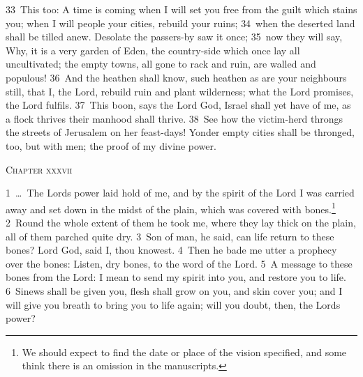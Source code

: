 \documentclass[10pt]{book} %
\begin{document}
\textcolor{benred8}{33}~This too: A time is coming when I will set you free from the guilt which stains you; when I will people your cities, rebuild your ruins; \textcolor{benred8}{34}~when the deserted land shall be tilled anew. Desolate the passers-by saw it once; \textcolor{benred8}{35}~now they will say, Why, it is a very garden of Eden, the country-side which once lay all uncultivated; the empty towns, all gone to rack and ruin, are walled and populous! \textcolor{benred8}{36}~And the heathen shall know, such heathen as are your neighbours still, that I, the Lord, rebuild ruin and plant wilderness; what the Lord promises, the Lord fulfils. \textcolor{benred8}{37}~This boon, says the Lord God, Israel shall yet have of me, as a flock thrives their manhood shall thrive. \textcolor{benred8}{38}~See how the victim-herd throngs the streets of Jerusalem on her feast-days! Yonder empty cities shall be thronged, too, but with men; the proof of my divine power.
\begin{large}\begin{center}\textsc{Chapter xxxvii}\end{center}\end{large}
\textcolor{benred8}{1}~\ldots\  The Lord\textquotesingle s power laid hold of me, and by the spirit of the Lord I was carried away and set down in the midst of the plain, which was covered with bones.\footnote[1]{We should expect to find the date or place of the vision specified, and some think there is an omission in the manuscripts.} \textcolor{benred8}{2}~Round the whole extent of them he took me, where they lay thick on the plain, all of them parched quite dry. \textcolor{benred8}{3}~Son of man, he said, can life return to these bones? Lord God, said I, thou knowest. \textcolor{benred8}{4}~Then he bade me utter a prophecy over the bones: Listen, dry bones, to the word of the Lord. \textcolor{benred8}{5}~A message to these bones from the Lord: I mean to send my spirit into you, and restore you to life. \textcolor{benred8}{6}~Sinews shall be given you, flesh shall grow on you, and skin cover you; and I will give you breath to bring you to life again; will you doubt, then, the Lord\textquotesingle s power?
\end{document}
